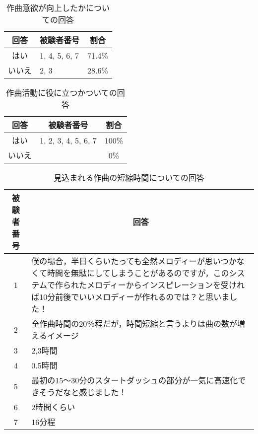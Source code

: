 \begin{table}[htbp]
  \begin{center}
    \caption{作曲意欲が向上したかについての回答}
    \begin{tabular}{|c|p{10em}|c|}
      \hline
      回答 & \multicolumn{1}{c|}{被験者番号} & 割合\rule[-3mm]{0mm}{8mm} \\ \hline \hline
      はい & 1, 4, 5, 6, 7 & 71.4\% \rule[-3mm]{0mm}{8mm} \\ \hline
      いいえ & 2, 3 & 28.6\% \rule[-3mm]{0mm}{8mm} \\ \hline
    \end{tabular}
  \end{center}
\end{table}

\begin{table}[htbp]
  \begin{center}
    \caption{作曲活動に役に立つかついての回答}
    \begin{tabular}{|c|p{10em}|c|}
      \hline
      回答 & \multicolumn{1}{c|}{被験者番号} & 割合\rule[-3mm]{0mm}{8mm} \\ \hline \hline
      はい & 1, 2, 3, 4, 5, 6, 7 & 100\% \rule[-3mm]{0mm}{8mm} \\ \hline
      いいえ &  & 0\% \rule[-3mm]{0mm}{8mm} \\ \hline
    \end{tabular}
  \end{center}
\end{table}

\begin{table}[htbp]
  \begin{center}
    \caption{見込まれる作曲の短縮時間についての回答}
    \begin{tabular}{|c|p{30em}|}
      \hline
      被験者番号 & \multicolumn{1}{c|}{回答}\rule[-3mm]{-1.3mm}{8mm} \\ \hline \hline
      1 & 僕の場合，半日くらいたっても全然メロディーが思いつかなくて時間を無駄にしてしまうことがあるのですが，このシステムで作られたメロディーからインスピレーションを受ければ10分前後でいいメロディーが作れるのでは？と思いました！\rule[-3mm]{0mm}{8mm} \\ \hline
      2 & 全作曲時間の20％程だが，時間短縮と言うよりは曲の数が増えるイメージ\rule[-3mm]{0mm}{8mm} \\ \hline
      3 & 2,3時間\rule[-3mm]{0mm}{8mm} \\ \hline
      4 & 0.5時間\rule[-3mm]{0mm}{8mm} \\ \hline
      5 & 最初の15〜30分のスタートダッシュの部分が一気に高速化できそうだなと感じました！\rule[-3mm]{0mm}{8mm} \\ \hline
      6 & 2時間くらい\rule[-3mm]{0mm}{8mm} \\ \hline
      7 & 16分程 \rule[-3mm]{0mm}{8mm} \\ \hline
    \end{tabular}
  \end{center}
\end{table}

